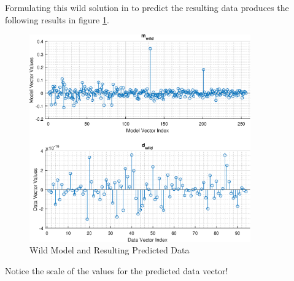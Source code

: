Formulating this wild solution in \MATLAB to predict the resulting data produces the following results in figure \ref{fig: prob2 part B wild data and model}.

\begin{figure}[h] 
	\centering
	\includegraphics[width=0.85\textwidth]{./images/prob2_partB_wild_model_and_data.eps}
	\caption{Wild Model and Resulting Predicted Data}
	\label{fig: prob2 part B wild data and model}
\end{figure}
\FloatBarrier

Notice the scale of the values for the predicted data vector!

